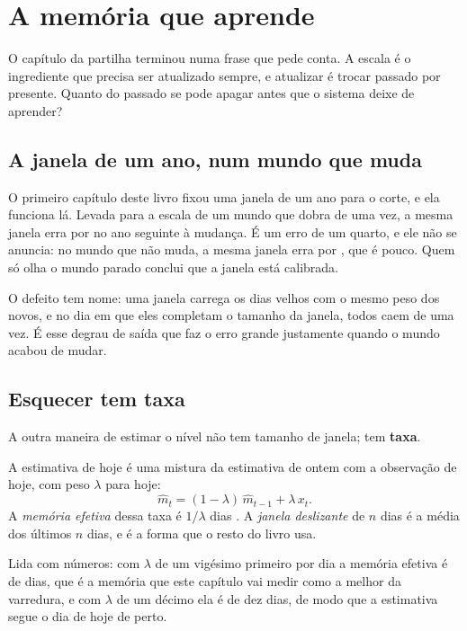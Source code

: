 \chapter{A memória que aprende}\label{cap:memoria}

O capítulo da partilha terminou numa frase que pede conta. A escala é o ingrediente que precisa ser
atualizado sempre, e atualizar é trocar passado por presente. Quanto do passado se pode apagar antes
que o sistema deixe de aprender?

\section{A janela de um ano, num mundo que muda}

O primeiro capítulo deste livro fixou uma janela de um ano para o corte, e ela funciona lá. Levada
para a escala de um mundo que dobra de uma vez, a mesma janela erra por \numEsquecimentoJanelaDuzentosECinquenta{}
no ano seguinte à mudança. É um erro de um quarto, e ele não se anuncia: no mundo que não muda, a
mesma janela erra por \numEsquecimentoPisoJanelaDuzentosECinquenta{}, que é pouco. Quem só olha o mundo
parado conclui que a janela está calibrada.

O defeito tem nome: uma janela carrega os dias velhos com o mesmo peso dos novos, e no dia em que
eles completam o tamanho da janela, todos caem de uma vez. É esse degrau de saída que faz o erro
grande justamente quando o mundo acabou de mudar.

\section{Esquecer tem taxa}

A outra maneira de estimar o nível não tem tamanho de janela; tem \textbf{taxa}.

\begin{definicao}\label{def:esquecimento}
A estimativa de hoje é uma mistura da estimativa de ontem com a observação de hoje, com peso
$\lambda$ para hoje:
\[
\hat m_t = (1-\lambda)\,\hat m_{t-1} + \lambda\, x_t .
\]
A \emph{memória efetiva} dessa taxa é $1/\lambda$ dias \cite{box2008time}. A \emph{janela deslizante} de $n$ dias é a
média dos últimos $n$ dias, e é a forma que o resto do livro usa.
\end{definicao}

Lida com números: com $\lambda$ de um vigésimo primeiro por dia a memória efetiva é de
\numEsquecimentoMelhorMemoria{} dias, que é a memória que este capítulo vai medir como a melhor da
varredura, e com $\lambda$ de um décimo ela é de dez dias, de modo que a estimativa segue o dia de
hoje de perto.

